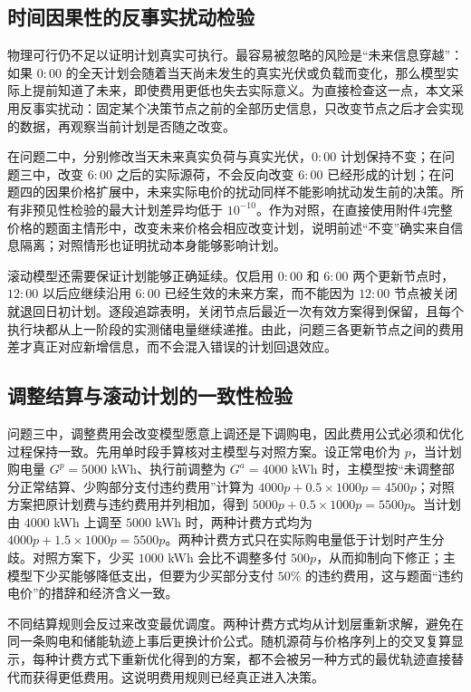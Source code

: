 \subsection{时间因果性的反事实扰动检验}

物理可行仍不足以证明计划真实可执行。最容易被忽略的风险是“未来信息穿越”：如果 $0{:}00$ 的全天计划会随着当天尚未发生的真实光伏或负载而变化，那么模型实际上提前知道了未来，即使费用更低也失去实际意义。为直接检查这一点，本文采用反事实扰动：固定某个决策节点之前的全部历史信息，只改变节点之后才会实现的数据，再观察当前计划是否随之改变。

在问题二中，分别修改当天未来真实负荷与真实光伏，$0{:}00$ 计划保持不变；在问题三中，改变 $6{:}00$ 之后的实际源荷，不会反向改变 $6{:}00$ 已经形成的计划；在问题四的因果价格扩展中，未来实际电价的扰动同样不能影响扰动发生前的决策。所有非预见性检验的最大计划差异均低于 $10^{-10}$。作为对照，在直接使用附件4完整价格的题面主情形中，改变未来价格会相应改变计划，说明前述“不变”确实来自信息隔离；对照情形也证明扰动本身能够影响计划。

滚动模型还需要保证计划能够正确延续。仅启用 $0{:}00$ 和 $6{:}00$ 两个更新节点时，$12{:}00$ 以后应继续沿用 $6{:}00$ 已经生效的未来方案，而不能因为 $12{:}00$ 节点被关闭就退回日初计划。逐段追踪表明，关闭节点后最近一次有效方案得到保留，且每个执行块都从上一阶段的实测储电量继续递推。由此，问题三各更新节点之间的费用差才真正对应新增信息，而不会混入错误的计划回退效应。

\subsection{调整结算与滚动计划的一致性检验}

问题三中，调整费用会改变模型愿意上调还是下调购电，因此费用公式必须和优化过程保持一致。先用单时段手算核对主模型与对照方案。设正常电价为 $p$，当计划购电量 $G^p=5000$ kWh、执行前调整为 $G^a=4000$ kWh 时，主模型按“未调整部分正常结算、少购部分支付违约费用”计算为 $4000p+0.5\times1000p=4500p$；对照方案把原计划费与违约费用并列相加，得到 $5000p+0.5\times1000p=5500p$。当计划由 $4000$ kWh 上调至 $5000$ kWh 时，两种计费方式均为 $4000p+1.5\times1000p=5500p$。两种计费方式只在实际购电量低于计划时产生分歧。对照方案下，少买 $1000$ kWh 会比不调整多付 $500p$，从而抑制向下修正；主模型下少买能够降低支出，但要为少买部分支付 $50\%$ 的违约费用，这与题面“违约电价”的措辞和经济含义一致。

不同结算规则会反过来改变最优调度。两种计费方式均从计划层重新求解，避免在同一条购电和储能轨迹上事后更换计价公式。随机源荷与价格序列上的交叉复算显示，每种计费方式下重新优化得到的方案，都不会被另一种方式的最优轨迹直接替代而获得更低费用。这说明费用规则已经真正进入决策。

